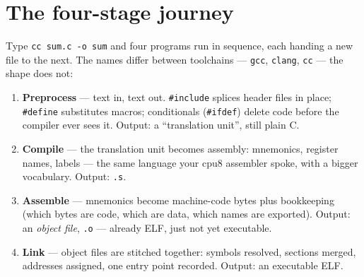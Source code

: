 \section{The four-stage journey}

Type \texttt{cc sum.c -o sum} and four programs run in sequence, each
handing a new file to the next. The names differ between toolchains ---
\texttt{gcc}, \texttt{clang}, \texttt{cc} --- the shape does not:

\begin{enumerate}
  \item \textbf{Preprocess} --- text in, text out. \texttt{\#include}
        splices header files in place; \texttt{\#define} substitutes
        macros; conditionals (\texttt{\#ifdef}) delete code before the
        compiler ever sees it. Output: a ``translation unit'', still plain
        C.
  \item \textbf{Compile} --- the translation unit becomes assembly:
        mnemonics, register names, labels --- the same language your cpu8
        assembler spoke, with a bigger vocabulary. Output: \texttt{.s}.
  \item \textbf{Assemble} --- mnemonics become machine-code bytes plus
        bookkeeping (which bytes are code, which are data, which names are
        exported). Output: an \emph{object file}, \texttt{.o} --- already
        ELF, just not yet executable.
  \item \textbf{Link} --- object files are stitched together: symbols
        resolved, sections merged, addresses assigned, one entry point
        recorded. Output: an executable ELF.
\end{enumerate}

